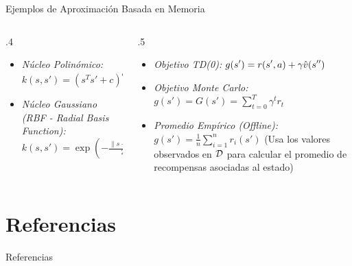 \documentclass[10pt, envcountsect, handout, aspectratio=1610, hyperref={hypertexnames=true}]{beamer}
\begin{document}
\begin{frame}{Ejemplos de Aproximación Basada en Memoria }
\begin{itemize}
\begin{columns}
\begin{column}{.4\textwidth}
\begin{itemize}
					\item \textit{Núcleo Polinómico:}
					$
					k(s, s') = (s^T s' + c)^d
					$
					
					\item \textit{Núcleo Gaussiano (RBF - Radial Basis Function):}
					$
					k(s, s') = \exp\left(-\frac{\|s - s'\|^2}{2\sigma^2}\right)
					$
				\end{itemize}
			\end{column}
			\begin{column}{.5\textwidth}
				\begin{itemize}
					\item \textit{Objetivo TD(0):}
					$\displaystyle
					g(s') = r(s', a) + \gamma \hat{v}(s'')
					$
					
					\item \textit{Objetivo Monte Carlo:}
					$
					g(s') = G(s') = \sum_{t=0}^{T} \gamma^t r_t
					$
					
					\item \textit{Promedio Empírico (Offline):}
					$
					g(s') = \frac{1}{n} \sum_{i=1}^{n} r_i(s')
					$
					(Usa los valores observados en $\cal D$  para calcular el promedio de recompensas asociadas al estado)
				\end{itemize}
			\end{column}
		\end{columns}
		
	\end{itemize}
\end{frame}







\section{Referencias}







\begin{frame}{Referencias} %
	
		\nocite{Sutton2018, silver2015, Hado2018Lecture3}
		
		\printbibliography[heading=none]
	\end{frame}    
	
\end{document}
